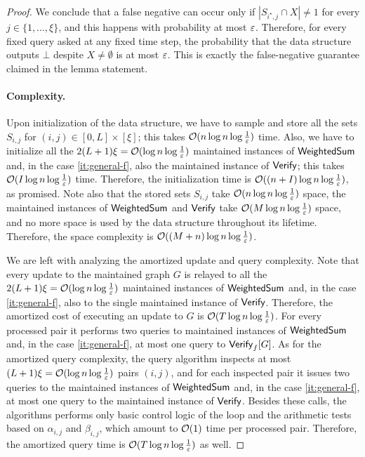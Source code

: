 \begin{proof}
We conclude that a false negative can occur only if $|S_{i^\star,j}\cap X|\neq 1$ for every $j\in\{1,\dots,\xi\}$, and this happens with probability at most $\varepsilon$.
Therefore, for every fixed query asked at any fixed time step, the probability that the data structure outputs $\bot$ despite $X\neq\emptyset$ is at most $\varepsilon$.
This is exactly the false-negative guarantee claimed in the lemma statement.

\paragraph*{Complexity.} Upon initialization of the data structure, we have to sample and store all the sets $S_{i,j}$ for $(i,j)\in [0,L]\times [\xi]$; this takes $\mathcal{O}(n\log n\log \tfrac{1}{\varepsilon})$ time. Also, we have to initialize all the $2(L+1)\xi=\mathcal{O}(\log n\log \tfrac{1}{\varepsilon})$ maintained instances of $\mathsf{WeightedSum}$ and, in the case \ref{it:general-f}, also the maintained instance of $\mathsf{Verify}$; this takes $\mathcal{O}(I\log n\log \tfrac{1}{\varepsilon})$ time.
Therefore, the initialization time is $\mathcal{O}((n+I)\log n\log \tfrac{1}{\varepsilon})$, as promised. Note also that the stored sets $S_{i,j}$ take $\mathcal{O}(n\log n\log \tfrac{1}{\varepsilon})$ space, the maintained instances of $\mathsf{WeightedSum}$ and $\mathsf{Verify}$ take $\mathcal{O}(M\log n\log \tfrac{1}{\varepsilon})$ space, and no more space is used by the data structure throughout its lifetime. Therefore, the space complexity is $\mathcal{O}((M+n)\log n\log \tfrac{1}{\varepsilon})$.

We are left with analyzing the amortized update and query complexity.
Note that every update to the maintained graph $G$ is relayed to all the $2(L+1)\xi=\mathcal{O}(\log n\log \tfrac{1}{\varepsilon})$ maintained instances of $\mathsf{WeightedSum}$ and, in the case \ref{it:general-f}, also to the single maintained instance of $\mathsf{Verify}$.
Therefore, the amortized cost of executing an update to $G$ is $\mathcal{O}(T\log n\log \tfrac{1}{\varepsilon})$.
For every processed pair it performs two queries to maintained instances of $\mathsf{WeightedSum}$ and, in the case \ref{it:general-f}, at most one query to $\mathsf{Verify}_f[G]$.
As for the amortized query complexity, the query algorithm inspects at most $(L+1)\xi=\mathcal{O}(\log n\log \tfrac{1}{\varepsilon})$ pairs $(i,j)$, and for each inspected pair it issues two queries to the maintained instances of $\mathsf{WeightedSum}$ and, in the case \ref{it:general-f}, at most one query to the maintained instance of $\mathsf{Verify}$.
Besides these calls, the algorithms performs only basic control logic of the loop and the arithmetic tests based on $\alpha_{i,j}$ and $\beta_{i,j}$, which amount to $\mathcal{O}(1)$ time per processed pair. Therefore, the amortized query time is $\mathcal{O}(T\log n\log \tfrac{1}{\varepsilon})$ as well.
\end{proof}


